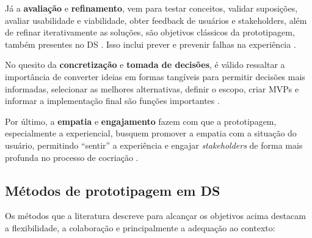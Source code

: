 Já a \textbf{avaliação} e \textbf{refinamento}, vem para testar conceitos, validar suposições, avaliar usabilidade e viabilidade, obter feedback de usuários e stakeholders, além de refinar iterativamente as soluções, são objetivos clássicos da prototipagem, também presentes no DS \cite{paust2025integrative, hegemann2024palette, quintero2021interdisciplinary, mager2023product, Vieira2025, asbjornsen2022echange, villa2022integratedcare}. Isso inclui prever e prevenir falhas na experiência \cite{mager2023product}.

No quesito da \textbf{concretização} e \textbf{tomada de decisões}, é válido ressaltar a importância de converter ideias em formas tangíveis para permitir decisões mais informadas, selecionar as melhores alternativas, definir o escopo, criar MVPs e informar a implementação final são funções importantes \cite{nguyen2022human, Vieira2025, schlott2024design, quintero2021interdisciplinary, iriarte2023service}.

Por último, a \textbf{empatia} e \textbf{engajamento} fazem com que a prototipagem, especialmente a experiencial, busquem promover a empatia com a situação do usuário, permitindo ``sentir'' a experiência e engajar \textit{stakeholders} de forma mais profunda no processo de cocriação \cite{soto2023prototyping, lambe2022capabilities, kumar2023rheumatology}.

\subsection{Métodos de prototipagem em DS}

Os métodos que a literatura descreve para alcançar os objetivos acima destacam a flexibilidade, a colaboração e principalmente a adequação ao contexto:

